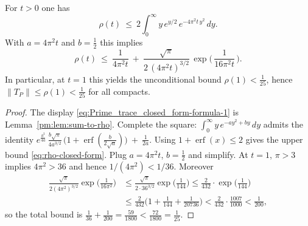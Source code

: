 \begin{lemma}\label{pm:lem:rho-closed-form}
For $t>0$ one has
\begin{equation}\label{eq:Prime_trace_closed_form-formula-1}
  \rho(t)\ \le\ 2\int_0^{\infty} y\,e^{y/2}\,e^{-4\pi^2 t\,y^2}\,dy.
\end{equation}
With $a=4\pi^2 t$ and $b=\tfrac12$ this implies
\begin{equation}\label{eq:rho-closed-form}
  \rho(t)\ \le\ \frac{1}{4\pi^2 t}\ +\ \frac{\sqrt\pi}{2\,(4\pi^2 t)^{3/2}}\,\exp\!\Big(\,\frac{1}{16\pi^2 t}\,\Big).
\end{equation}
In particular, at $t=1$ this yields the unconditional bound $\rho(1)<\tfrac{1}{25}$, hence $\|T_P\|\le \rho(1)<\tfrac{1}{25}$ for all compacts.
\end{lemma}
\begin{proof}
The display \eqref{eq:Prime_trace_closed_form-formula-1} is Lemma~\ref{pm:lem:sum-to-rho}. Complete the square: $\int_0^{\infty} y\,e^{-a y^2 + b y}\,dy$ admits the identity
\(
  e^{\frac{b^2}{4a}}\,\frac{b\sqrt\pi}{4a^{3/2}}\,\bigl(1+\operatorname{erf}(\tfrac{b}{2\sqrt a})\bigr)\ +\ \frac{1}{2a}.
\)
Using $1+\operatorname{erf}(x)\le2$ gives the upper bound \eqref{eq:rho-closed-form}. Plug $a=4\pi^2 t$, $b=\tfrac12$ and simplify.
At $t=1$, $\pi>3$ implies $4\pi^2>36$ and hence $1/(4\pi^2)<1/36$. Moreover
\begin{align*}
\frac{\sqrt{\pi}}{2(4\pi^2)^{3/2}}\exp\!\Big(\frac{1}{16\pi^2}\Big)
&\le \frac{\sqrt{\pi}}{2\cdot 36^{3/2}}\exp\!\Big(\frac{1}{144}\Big)
\le \frac{2}{432}\cdot\exp\!\Big(\frac{1}{144}\Big) \\
&\le \frac{2}{432}\Big(1+\frac{1}{144}+\frac{1}{20736}\Big)
< \frac{2}{432}\cdot\frac{1007}{1000}
< \frac{1}{200},
\end{align*}
so the total bound is
\(
\tfrac{1}{36}+\tfrac{1}{200}
=\tfrac{59}{1800}
<\tfrac{72}{1800}
=\tfrac{1}{25}.
\)
\end{proof}

